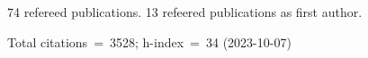 74 refereed publications. 13 refeered publications as first author.

Total citations~=~3528; h-index~=~34 (2023-10-07)